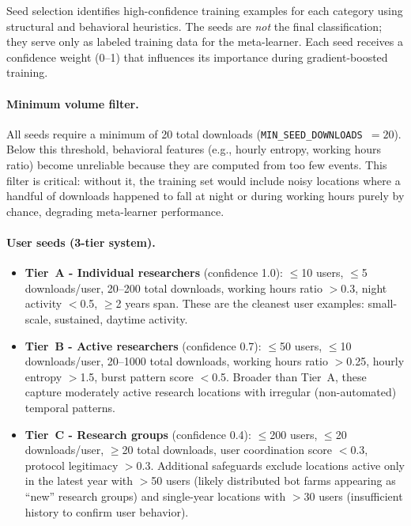 \documentclass[11pt,a4paper]{article}
\begin{document}
Seed selection identifies high-confidence training examples for each category using structural and behavioral heuristics. The seeds are \emph{not} the final classification; they serve only as labeled training data for the meta-learner. Each seed receives a confidence weight (0--1) that influences its importance during gradient-boosted training.

\paragraph{Minimum volume filter.} All seeds require a minimum of 20 total downloads (\texttt{MIN\_SEED\_DOWNLOADS}~$= 20$). Below this threshold, behavioral features (e.g., hourly entropy, working hours ratio) become unreliable because they are computed from too few events. This filter is critical: without it, the training set would include noisy locations where a handful of downloads happened to fall at night or during working hours purely by chance, degrading meta-learner performance.

\paragraph{User seeds (3-tier system).}
\begin{itemize}
    \item \textbf{Tier~A - Individual researchers} (confidence 1.0): $\leq$10 users, $\leq$5 downloads/user, 20--200 total downloads, working hours ratio $>$0.3, night activity $<$0.5, $\geq$2 years span. These are the cleanest user examples: small-scale, sustained, daytime activity.
    \item \textbf{Tier~B - Active researchers} (confidence 0.7): $\leq$50 users, $\leq$10 downloads/user, 20--1000 total downloads, working hours ratio $>$0.25, hourly entropy $>$1.5, burst pattern score $<$0.5. Broader than Tier~A, these capture moderately active research locations with irregular (non-automated) temporal patterns.
    \item \textbf{Tier~C - Research groups} (confidence 0.4): $\leq$200 users, $\leq$20 downloads/user, $\geq$20 total downloads, user coordination score $<$0.3, protocol legitimacy $>$0.3. Additional safeguards exclude locations active only in the latest year with $>$50 users (likely distributed bot farms appearing as ``new'' research groups) and single-year locations with $>$30 users (insufficient history to confirm user behavior).
\end{itemize}
\end{document}
